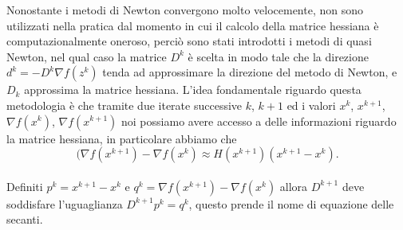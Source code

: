 \documentclass[a4paper, 12pt]{article}
\begin{document}
Nonostante i metodi di Newton convergono molto velocemente, non sono utilizzati nella pratica dal momento in cui il calcolo della matrice hessiana è computazionalmente oneroso, perciò sono stati introdotti i metodi di quasi Newton, nel qual caso la matrice $D^k$ è scelta in modo tale che la direzione $d^k = -D^k\nabla f(z^k)$ tenda ad approssimare la direzione del metodo di Newton, e $D_k$ approssima la matrice hessiana. L'idea fondamentale riguardo questa metodologia è che tramite due iterate successive $k$, $k+1$ ed i valori $x^k$, $x^{k+1}$, $\nabla f(x^k)$, $\nabla f(x^{k+1})$ noi possiamo avere accesso a delle informazioni riguardo la matrice hessiana, in particolare abbiamo che\\
\[(\nabla f(x^{k+1}) - \nabla f(x^k) \approx H(x^{k+1})(x^{k+1} - x^k).\]\\
Definiti $p^k = x^{k+1} - x^k$ e $q^k = \nabla f(x^{k+1}) - \nabla f(x^k)$ allora $D^{k+1}$ deve soddisfare l'uguaglianza $D^{k+1} p^k = q^k$, questo prende il nome di equazione delle secanti.
\end{document}
